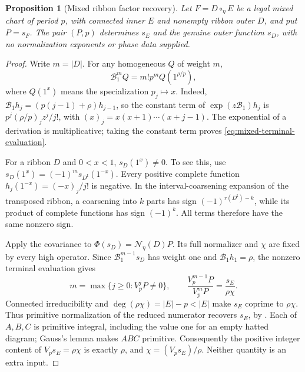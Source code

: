 \documentclass[11pt,a4paper]{amsart}
\numberwithin{equation}{section}
\theoremstyle{plain}
\newtheorem{proposition}[theorem]{Proposition}
\theoremstyle{definition}
\begin{document}
\begin{proposition}[Mixed ribbon factor recovery]\label{rt:mixed-readout}
Let \(F=D\circ_\eta E\) be a legal mixed chart of period \(p\), with connected inner \(E\) and nonempty ribbon outer \(D\), and put \(P=s_F\).  The pair \((P,p)\) determines \(s_E\) and the genuine outer function \(s_D\), with no normalization exponents or phase data supplied.
\end{proposition}
\begin{proof}
Write \(m=|D|\).  For any homogeneous \(Q\) of weight \(m\),
\begin{equation}\label{eq:mixed-terminal-evaluation}
 \mathcal B_1^mQ=m!p^m Q(1^{\rho/p}),
\end{equation}
where \(Q(1^x)\) means the specialization \(p_j\mapsto x\).  Indeed,
\(\mathcal B_1h_j=(p(j-1)+\rho)h_{j-1}\), so the constant term of
\(\exp(z\mathcal B_1)h_j\) is \(p^j(\rho/p)_jz^j/j!\), with \((x)_j=x(x+1)\cdots(x+j-1)\).  The exponential of a derivation is multiplicative; taking the constant term proves \eqref{eq:mixed-terminal-evaluation}.

For a ribbon \(D\) and \(0<x<1\), \(s_D(1^x)\ne0\).  To see this, use
\(s_D(1^x)=(-1)^m s_{D^{\mathsf t}}(1^{-x})\).  Every positive complete function \(h_j(1^{-x})=(-x)_j/j!\) is negative.  In the interval-coarsening expansion of the transposed ribbon, a coarsening into \(k\) parts has sign \((-1)^{r(D^{\mathsf t})-k}\), while its product of complete functions has sign \((-1)^k\).  All terms therefore have the same nonzero sign.

Apply the covariance to
\(\Phi(s_D)=\mathcal N_\eta(D)P\).  Its full normalizer and \(\chi\) are fixed by every high operator.  Since \(\mathcal B_1^{m-1}s_D\) has weight one and \(\mathcal B_1h_1=\rho\), the nonzero terminal evaluation gives
\begin{equation}\label{eq:mixed-terminal-ratio}
 m=\max\{j\ge0:V_p^jP\ne0\},\qquad
 \frac{V_p^{m-1}P}{V_p^mP}=\frac{s_E}{\rho\chi}.
\end{equation}
Connected irreducibility and \(\deg(\rho\chi)=|E|-p<|E|\) make \(s_E\) coprime to \(\rho\chi\).  Thus primitive normalization of the reduced numerator recovers \(s_E\), by .  Each of \(A,B,C\) is primitive integral, including the value one for an empty hatted diagram; Gauss's lemma makes \(ABC\) primitive.  Consequently the positive integer content of \(V_p s_E=\rho\chi\) is exactly \(\rho\), and \(\chi=(V_p s_E)/\rho\).  Neither quantity is an extra input.


\end{proof}
\end{document}
